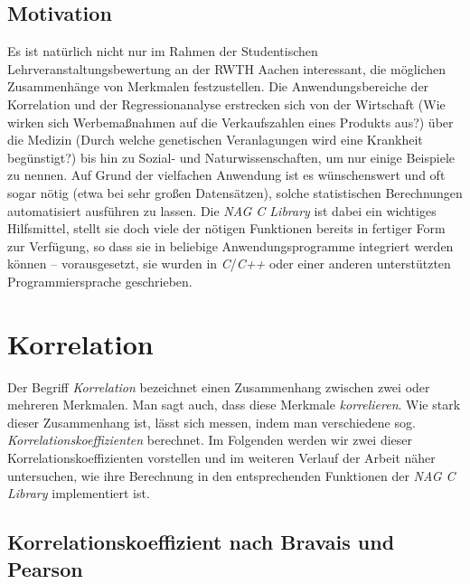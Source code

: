 \documentclass{article}
\begin{document}
\subsection{Motivation}

Es ist natürlich nicht nur im Rahmen der Studentischen Lehrveranstaltungsbewertung an der RWTH Aachen interessant, die möglichen Zusammenhänge von Merkmalen festzustellen. Die Anwendungsbereiche der Korrelation und der Regressionanalyse erstrecken sich von der Wirtschaft (Wie wirken sich Werbemaßnahmen auf die Verkaufszahlen eines Produkts aus?) über die Medizin (Durch welche genetischen Veranlagungen wird eine Krankheit begünstigt?) bis hin zu Sozial- und Naturwissenschaften, um nur einige Beispiele zu nennen. Auf Grund der vielfachen Anwendung ist es wünschenswert und oft sogar nötig (etwa bei sehr großen Datensätzen), solche statistischen Berechnungen automatisiert ausführen zu lassen. Die {\it NAG C Library} ist dabei ein wichtiges Hilfsmittel, stellt sie doch viele der nötigen Funktionen bereits in fertiger Form zur Verfügung, so dass sie in beliebige Anwendungsprogramme integriert werden können -- vorausgesetzt, sie wurden in {\it C}/{\it C++} oder einer anderen unterstützten Programmiersprache geschrieben.

\section{Korrelation}

Der Begriff {\it Korrelation} bezeichnet einen Zusammenhang zwischen zwei oder mehreren Merkmalen. Man sagt auch, dass diese Merkmale {\it korrelieren}. Wie stark dieser Zusammenhang ist, lässt sich messen, indem man verschiedene sog. {\it Korrelationskoeffizienten} berechnet. Im Folgenden werden wir zwei dieser Korrelationskoeffizienten vorstellen und im weiteren Verlauf der Arbeit näher untersuchen, wie ihre Berechnung in den entsprechenden Funktionen der {\it NAG C Library} implementiert ist.

\subsection{Korrelationskoeffizient nach Bravais und Pearson}
\end{document}
